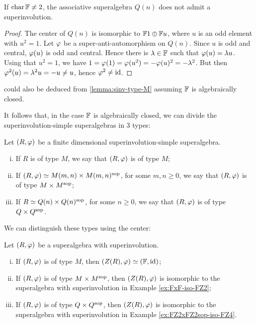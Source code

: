 \begin{cor}\label{cor:Q-no-sinv-center}
	If $\operatorname{char} \mathbb{F} \neq 2$, the associative superalgebra $Q(n)$ does not admit a superinvolution.
\end{cor}

\begin{proof}
	The center of $Q(n)$ is isomorphic to $\mathbb{F}1 \oplus \mathbb{F} u$, where $u$ is an odd element with $u^2 = 1$.
	Let $\varphi$ be a super-anti-automorphism on $Q(n)$.
	Since $u$ is odd and central, $\varphi(u)$ is odd and central.
	Hence there is $\lambda \in \mathbb{F}$ such that $\varphi(u) = \lambda u$.
	Using that $u^2 = 1$, we have $1 = \varphi(1) = \varphi(u^2) = - \varphi(u)^2 = - \lambda^2$.
	But then $\varphi^2 (u) = \lambda^2 u = -u \neq u$, hence $\varphi^2 \neq \operatorname{id}$.
\end{proof}

\begin{remark}
     could also be deduced from \cref{lemma:sinv-type-M} assuming $\mathbb{F}$ is algebraically closed. 
\end{remark}

It follows that, in the case $\mathbb{F}$ is algebraically closed, we can divide the superinvolution-simple superalgebras in 3 types:

\begin{defi}
    Let $(R, \varphi)$ be a finite dimensional superinvolution-simple superalgebra. 
    \begin{enumerate}[(i)]
        \item If $R$ is of type $M$, we say that $(R, \varphi)$ is of type $M$;
        \item If $(R, \varphi) \simeq M(m,n) \times M(m,n)^{\mathrm{sop}}$, for some $m,n \geq 0$, we say that $(R, \varphi)$ is of type $M\times M^{\mathrm{sop}}$;
        \item If $R \simeq Q(n) \times Q(n)^{\mathrm{sop}}$, for some $n \geq 0$, we say that $(R, \varphi)$ is of type $Q \times Q^{\mathrm{sop}}$.
    \end{enumerate}
\end{defi}

We can distinguish these types using the center:

\begin{prop}\label{prop:types-of-SA-via-center}
	Let $(R, \varphi)$ be a superalgebra with superinvolution.
	\begin{enumerate}[(i)]
		\item If $(R, \varphi)$ is of type $M$, then $(Z(R), \varphi) \simeq (\mathbb{F}, \operatorname{id})$;\label{item:F-id}
		\item If $(R, \varphi)$ is of type $M\times M^{\mathrm{sop}}$, then $(Z(R), \varphi)$ is isomorphic to the superalgebra with superinvolution in Example \ref{ex:FxF-iso-FZ2};\label{item:FZ2-exchg}
		\item If $(R, \varphi)$ is of type $Q\times Q^{\mathrm{sop}}$, then $(Z(R), \varphi)$ is isomorphic to the superalgebra with superinvolution in Example \ref{ex:FZ2xFZ2sop-iso-FZ4}.\label{item:FZ4-exchg}
	\end{enumerate}
\end{prop}

